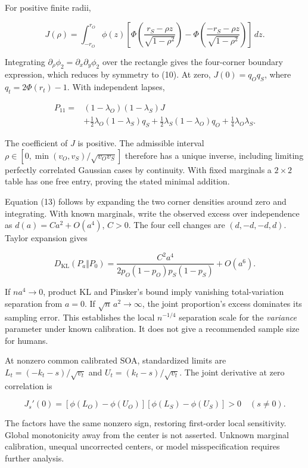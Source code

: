 \documentclass[
  11pt,
]{article}
\begin{document}
For positive finite radii,

\[
J(\rho)=\int_{-r_O}^{r_O}\phi(z)
\left[
\Phi\!\left(\frac{r_S-\rho z}{\sqrt{1-\rho^2}}\right)
-\Phi\!\left(\frac{-r_S-\rho z}{\sqrt{1-\rho^2}}\right)
\right]\,dz .
\tag{B1}
\]

Integrating \(\partial_\rho\phi_2=\partial_x\partial_y\phi_2\) over the
rectangle gives the four-corner boundary expression, which reduces by
symmetry to (10). At zero, \(J(0)=q_Oq_S\), where \(q_t=2\Phi(r_t)-1\).
With independent lapses,

\[
\begin{aligned}
P_{11}={}&(1-\lambda_O)(1-\lambda_S)J\\
&+\tfrac12\lambda_O(1-\lambda_S)q_S
+\tfrac12\lambda_S(1-\lambda_O)q_O
+\tfrac14\lambda_O\lambda_S .
\end{aligned}
\tag{B2}
\]

The coefficient of \(J\) is positive. The admissible interval
\(\rho\in[0,\min(v_O,v_S)/\sqrt{v_Ov_S}]\) therefore has a unique
inverse, including limiting perfectly correlated Gaussian cases by
continuity. With fixed marginals a \(2\times2\) table has one free
entry, proving the stated minimal addition.

Equation (13) follows by expanding the two corner densities around zero
and integrating. With known marginals, write the observed excess over
independence as \(d(a)=Ca^2+O(a^4)\), \(C>0\). The four cell changes are
\((d,-d,-d,d)\). Taylor expansion gives

\[
D_{\mathrm{KL}}(P_a\Vert P_0)=
\frac{C^2a^4}{2p_O(1-p_O)p_S(1-p_S)}
+O(a^6).
\tag{B3}
\]

If \(na^4\to0\), product KL and Pinsker's bound imply vanishing
total-variation separation from \(a=0\). If \(\sqrt n\,a^2\to\infty\),
the joint proportion's excess dominates its sampling error. This
establishes the local \(n^{-1/4}\) separation scale for the
\emph{variance} parameter under known calibration. It does not give a
recommended sample size for humans.

At nonzero common calibrated SOA, standardized limits are
\(L_t=(-k_t-s)/\sqrt{v_t}\) and \(U_t=(k_t-s)/\sqrt{v_t}\). The joint
derivative at zero correlation is

\[
J_s'(0)=[\phi(L_O)-\phi(U_O)]
[\phi(L_S)-\phi(U_S)]>0 \quad(s\ne0).
\tag{B4}
\]

The factors have the same nonzero sign, restoring first-order local
sensitivity. Global monotonicity away from the center is not asserted.
Unknown marginal calibration, unequal uncorrected centers, or model
misspecification requires further analysis.
\end{document}
